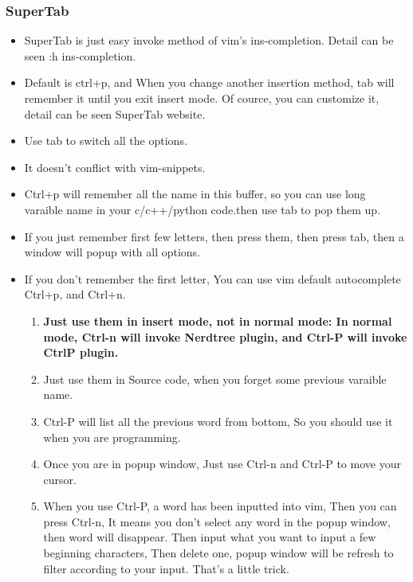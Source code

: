\documentclass[paper=8.5in:11in, twoside, 12pt, pagesize=pdftex]{book}
\begin{document}
									\subsubsection{SuperTab}
									\begin{itemize}
										\item SuperTab is just easy invoke method of vim's ins-completion. Detail can be seen :h ins-completion.
										
										\item Default is ctrl+p, and When you change another insertion method, tab will remember it until you exit insert mode. Of cource, you can customize it, detail can be seen SuperTab website.
										
										\item Use tab to switch all the options. 
										
										\item It doesn't conflict with vim-snippets. 
										
										\item Ctrl+p will remember all the name in this buffer, so you can use long varaible name in your c/c++/python code.then use tab to pop them up. 
										
										\item If you just remember first few letters, then press them, then press tab, then a window will popup with all options.
										
										\item If you don't remember the first letter, You can use vim default autocomplete Ctrl+p, and Ctrl+n. 
										
										\begin{enumerate}
											\item \textbf{Just use them in insert mode, not in normal mode: In normal mode, Ctrl-n will invoke Nerdtree plugin, and Ctrl-P will invoke CtrlP plugin.}
											
											\item Just use them in Source code, when you forget some previous varaible name.
											
											\item Ctrl-P will list all the previous word from bottom, So you should use it when you are programming.
											
											\item Once you are in popup window, Just use Ctrl-n and Ctrl-P to move your cursor. 
											
											\item When you use Ctrl-P, a word has been inputted into vim, Then you can press Ctrl-n, It means you don't select any word in the popup window, then word will disappear. Then input what you want to input a few beginning characters, Then delete one, popup window will be refresh to filter according to your input. That's a little trick.
											
										\end{enumerate}
									\end{itemize}
									
\end{document}

